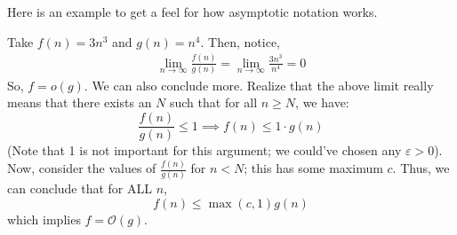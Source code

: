 Here is an example to get a feel for how asymptotic notation works.

\begin{example}
    Take $f(n) = 3n^3$ and $g(n) = n^4$. Then, notice,
    \begin{align*}
        \lim_{n \to \infty} \frac{f(n)}{g(n)} = \lim_{n \to \infty} \frac{3n^3}{n^4} = 0
    \end{align*}
    So, $f = o(g)$. We can also conclude more. Realize that the above limit really means that
    there exists an $N$ such that for all $n \geq N$, we have:
    \[ \frac{f(n)}{g(n)} \leq 1 \implies f(n) \leq 1 \cdot g(n) \]
    (Note that 1 is not important for this argument; we could've chosen any $\varepsilon > 0$).
    Now, consider the values of $\frac{f(n)}{g(n)}$ for $n < N$; this has some maximum $c$. Thus, we can conclude
    that for ALL $n$,
    \[ f(n) \leq \max(c, 1) g(n) \]
    which implies $f = \mathcal{O}(g)$.
\end{example}